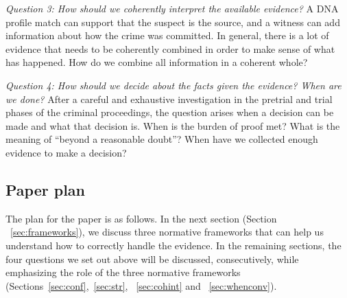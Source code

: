 \documentclass[10pt]{article}
\begin{document}
\textit{Question 3:	How should we coherently interpret the available evidence?}
A DNA profile match can support that the suspect is the source, and a witness can add information about how the crime was committed. In general, there is a lot of evidence that needs to be coherently combined in order to make sense of what has happened. How do we combine all information in a coherent whole?

\textit{Question 4:	How should we decide about the facts given the evidence? When are we done?}
After a careful and exhaustive investigation in the pretrial and trial phases of the criminal proceedings, the question arises when a decision can be made and what that decision is. When is the burden of proof met? What is the meaning of ``beyond a reasonable doubt''? When have we collected enough evidence to make a decision?

\subsection{Paper plan}

The plan for the paper is as follows. In the next section  (Section ~\ref{sec:frameworks}), we discuss three normative frameworks 
that can help us understand how to correctly handle the evidence. %
In the remaining sections, the four questions we set out above will be discussed, consecutively, while emphasizing 
the role of the three normative frameworks (Sections~\ref{sec:conf},~\ref{sec:str}, ~\ref{sec:cohint} and ~\ref{sec:whenconv}). 
\end{document}
